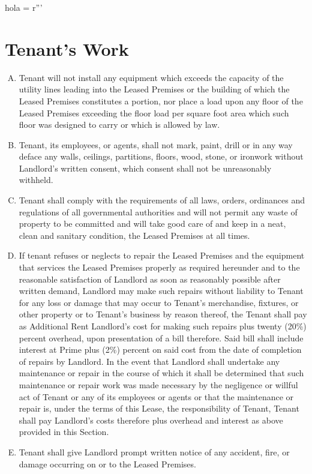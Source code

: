 hola = r'''\documentclass{article}
\begin{document}
\section{Tenant's Work}
    \begin{enumerate}[(A)]
    \item	Tenant will not install any equipment which exceeds the capacity of the utility lines leading into the Leased Premises or the building of which the Leased Premises constitutes a portion, nor place a load upon any floor of the Leased Premises exceeding the floor load per square foot area which such floor was designed to carry or which is allowed by law.
    \item	Tenant, its employees, or agents, shall not mark, paint, drill or in any way deface any walls, ceilings, partitions, floors, wood, stone, or ironwork without Landlord’s written consent, which consent shall not be unreasonably withheld.
    \item	Tenant shall comply with the requirements of all laws, orders, ordinances and regulations of all governmental authorities and will not permit any waste of property to be committed and will take good care of and keep in a neat, clean and sanitary condition, the Leased Premises at all times.
    \item	If tenant refuses or neglects to repair the Leased Premises and the equipment that services the Leased Premises properly as required hereunder and to the reasonable satisfaction of Landlord as soon as reasonably possible after written demand, Landlord may make such repairs without liability to Tenant for any loss or damage that may occur to Tenant’s merchandise, fixtures, or other property or to Tenant’s business by reason thereof, the Tenant shall pay as Additional Rent Landlord’s cost for making such repairs plus twenty (20\%) percent overhead, upon presentation of a bill therefore.  Said bill shall include interest at Prime plus (2\%) percent on said cost from the date of completion of repairs by Landlord.  In the event that Landlord shall undertake any maintenance or repair in the course of which it shall be determined that such maintenance or repair work was made necessary by the negligence or willful act of Tenant or any of its employees or agents or that the maintenance or repair is, under the terms of this Lease, the responsibility of Tenant, Tenant shall pay Landlord’s costs therefore plus overhead and interest as above provided in this Section.
    \item	Tenant shall give Landlord prompt written notice of any accident, fire, or damage occurring on or to the Leased Premises.

\end{enumerate}
\end{document}
